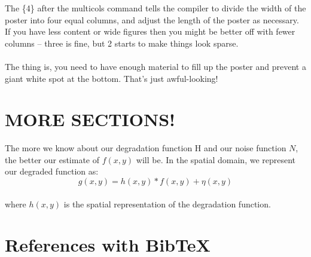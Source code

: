 \documentclass[landscape]{sciposter}
\begin{document}
\begin{multicols}{4}
The \{4\} after the multicols command tells the compiler to divide the width of the poster into four equal columns, and adjust the length of the poster as necessary.  If you have less content or wide figures then you might be better off with fewer columns -- three is fine, but 2 starts to make things look sparse.
\\
\\
The thing is, you need to have enough material to fill up the poster and prevent a giant white spot at the bottom.  That's just awful-looking!


\section{MORE SECTIONS!}

The more we know about our degradation function H and our noise function $N$, the better our estimate of $f(x,y)$ will be. In the spatial domain, we represent our degraded function as: 
\\
\begin{equation}
g(x,y)=h(x,y) \ast f(x,y) + \eta(x,y)
\label{eq:conv}
\end{equation}
\\
where $h(x,y)$ is the spatial representation of the degradation function. 

\section{References with BibTeX}


\end{multicols}
\end{document}
